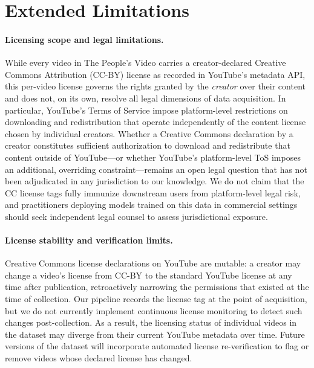 \documentclass{article}
\begin{document}
\section{Extended Limitations}
\label{app:limitations}

\paragraph{Licensing scope and legal limitations.}
While every video in The People's Video carries a creator-declared Creative Commons Attribution (CC-BY) license as recorded in YouTube's metadata API, this per-video license governs the rights granted by the \emph{creator} over their content and does not, on its own, resolve all legal dimensions of data acquisition. In particular, YouTube's Terms of Service impose platform-level restrictions on downloading and redistribution that operate independently of the content license chosen by individual creators. Whether a Creative Commons declaration by a creator constitutes sufficient authorization to download and redistribute that content outside of YouTube---or whether YouTube's platform-level ToS imposes an additional, overriding constraint---remains an open legal question that has not been adjudicated in any jurisdiction to our knowledge. We do not claim that the CC license tags fully immunize downstream users from platform-level legal risk, and practitioners deploying models trained on this data in commercial settings should seek independent legal counsel to assess jurisdictional exposure.

\paragraph{License stability and verification limits.}
Creative Commons license declarations on YouTube are mutable: a creator may change a video's license from CC-BY to the standard YouTube license at any time after publication, retroactively narrowing the permissions that existed at the time of collection. Our pipeline records the license tag at the point of acquisition, but we do not currently implement continuous license monitoring to detect such changes post-collection. As a result, the licensing status of individual videos in the dataset may diverge from their current YouTube metadata over time. Future versions of the dataset will incorporate automated license re-verification to flag or remove videos whose declared license has changed.
\end{document}
